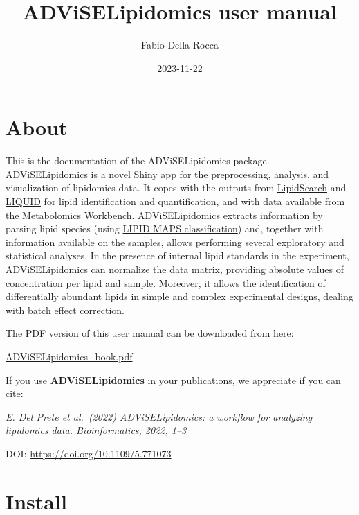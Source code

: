 \documentclass[
]{book}
\title{ADViSELipidomics user manual}
\author{Fabio Della Rocca}
\date{2023-11-22}
\begin{document}
\maketitle

{
\setcounter{tocdepth}{1}
\tableofcontents
}
\hypertarget{about}{%
\chapter{About}\label{about}}

This is the documentation of the ADViSELipidomics package. ADViSELipidomics is a novel Shiny app for the preprocessing, analysis, and visualization of lipidomics data. It copes with the outputs from \href{https://www.thermofisher.com/it/en/home/industrial/mass-spectrometry/liquid-chromatography-mass-spectrometry-lc-ms/lc-ms-software/multi-omics-data-analysis/lipid-search-software.html}{LipidSearch} and \href{https://github.com/PNNL-Comp-Mass-Spec/LIQUID}{LIQUID} for lipid identification and quantification, and with data available from the \href{https://www.metabolomicsworkbench.org/}{Metabolomics Workbench}. ADViSELipidomics extracts information by parsing lipid species (using \href{https://www.lipidmaps.org/data/classification/lipid_cns.html}{LIPID MAPS classification}) and, together with information available on the samples, allows performing several exploratory and statistical analyses. In the presence of internal lipid standards in the experiment, ADViSELipidomics can normalize the data matrix, providing absolute values of concentration per lipid and sample. Moreover, it allows the identification of differentially abundant lipids in simple and complex experimental designs, dealing with batch effect correction.

The PDF version of this user manual can be downloaded from here:

\href{https://github.com/ShinyFabio/ADViSELipidomics_book/raw/main/docs/ADViSELipidomics_book.pdf}{ADViSELipidomics\_book.pdf}

If you use \textbf{ADViSELipidomics} in your publications, we appreciate if you can cite:

\emph{E. Del Prete et al.~(2022) ADViSELipidomics: a workflow for analyzing lipidomics data. Bioinformatics, 2022, 1--3}

DOI: \url{https://doi.org/10.1109/5.771073}

\hypertarget{install}{%
\chapter{Install}\label{install}}
\end{document}
